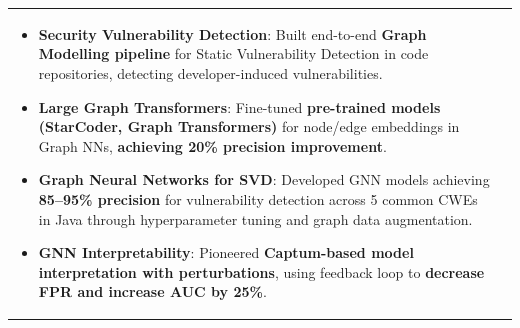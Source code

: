 \documentclass[a4paper,11pt]{article}
\begin{document}
\begin{tabularx}{\linewidth}{ @{}l r@{} }
\begin{minipage}[t]{\linewidth}
\begin{itemize}[nosep,after=\strut, leftmargin=1em, itemsep=4pt]
        \item \textbf{Security Vulnerability Detection}: Built end-to-end \textbf{Graph Modelling pipeline} for Static Vulnerability Detection in code repositories, detecting developer-induced vulnerabilities.
        \item \textbf{Large Graph Transformers}: Fine-tuned \textbf{pre-trained models (StarCoder, Graph Transformers)} for node/edge embeddings in Graph NNs, \textbf{achieving 20\% precision improvement}.
        \item \textbf{Graph Neural Networks for SVD}: Developed GNN models achieving \textbf{85–95\% precision} for vulnerability detection across 5 common CWEs in Java through hyperparameter tuning and graph data augmentation.
        \item \textbf{GNN Interpretability}: Pioneered \textbf{Captum-based model interpretation with perturbations}, using feedback loop to \textbf{decrease FPR and increase AUC by 25\%}.
    \end{itemize}
\end{minipage}
\end{tabularx}
\end{document}
